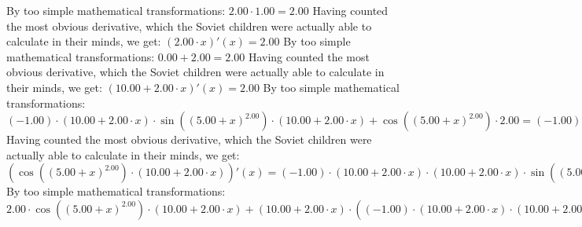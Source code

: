 \documentclass{article}
\begin{document}
\newline
By too simple mathematical transformations:
 ${{2.00} \cdot {1.00}} = {2.00}$ 
 \newline
 \newline 
Having counted the most obvious derivative, which the Soviet children were actually able to calculate in their minds, we get:
$({{2.00} \cdot {x}})'(x) = {2.00}$\newline
\newline
By too simple mathematical transformations:
 ${{0.00} + {2.00}} = {2.00}$ 
 \newline
 \newline 
Having counted the most obvious derivative, which the Soviet children were actually able to calculate in their minds, we get:
$({{10.00} + {{2.00} \cdot {x}}})'(x) = {2.00}$\newline
\newline
By too simple mathematical transformations:
 ${{{\left({-1.00}\right) \cdot {\left({{10.00} + {{2.00} \cdot {x}}}\right) \cdot  \sin {\left({\left({{5.00} + {x}}\right) ^ {2.00}}\right)} }} \cdot \left({{10.00} + {{2.00} \cdot {x}}}\right)} + { \cos {\left({\left({{5.00} + {x}}\right) ^ {2.00}}\right)}  \cdot {2.00}}} = {{\left({-1.00}\right) \cdot {\left({{10.00} + {{2.00} \cdot {x}}}\right) \cdot {\left({{10.00} + {{2.00} \cdot {x}}}\right) \cdot  \sin {\left({\left({{5.00} + {x}}\right) ^ {2.00}}\right)} }}} + {{2.00} \cdot  \cos {\left({\left({{5.00} + {x}}\right) ^ {2.00}}\right)} }}$ 
 \newline
 \newline 
Having counted the most obvious derivative, which the Soviet children were actually able to calculate in their minds, we get:
$({ \cos {\left({\left({{5.00} + {x}}\right) ^ {2.00}}\right)}  \cdot \left({{10.00} + {{2.00} \cdot {x}}}\right)})'(x) = {{\left({-1.00}\right) \cdot {\left({{10.00} + {{2.00} \cdot {x}}}\right) \cdot {\left({{10.00} + {{2.00} \cdot {x}}}\right) \cdot  \sin {\left({\left({{5.00} + {x}}\right) ^ {2.00}}\right)} }}} + {{2.00} \cdot  \cos {\left({\left({{5.00} + {x}}\right) ^ {2.00}}\right)} }}$\newline
\newline
By too simple mathematical transformations:
 ${{{2.00} \cdot { \cos {\left({\left({{5.00} + {x}}\right) ^ {2.00}}\right)}  \cdot \left({{10.00} + {{2.00} \cdot {x}}}\right)}} + {\left({{10.00} + {{2.00} \cdot {x}}}\right) \cdot \left({{\left({-1.00}\right) \cdot {\left({{10.00} + {{2.00} \cdot {x}}}\right) \cdot {\left({{10.00} + {{2.00} \cdot {x}}}\right) \cdot  \sin {\left({\left({{5.00} + {x}}\right) ^ {2.00}}\right)} }}} + {{2.00} \cdot  \cos {\left({\left({{5.00} + {x}}\right) ^ {2.00}}\right)} }}\right)}} = {{{2.00} \cdot { \cos {\left({\left({{5.00} + {x}}\right) ^ {2.00}}\right)}  \cdot \left({{10.00} + {{2.00} \cdot {x}}}\right)}} + {\left({{10.00} + {{2.00} \cdot {x}}}\right) \cdot \left({{\left({-1.00}\right) \cdot {\left({{10.00} + {{2.00} \cdot {x}}}\right) \cdot {\left({{10.00} + {{2.00} \cdot {x}}}\right) \cdot  \sin {\left({\left({{5.00} + {x}}\right) ^ {2.00}}\right)} }}} + {{2.00} \cdot  \cos {\left({\left({{5.00} + {x}}\right) ^ {2.00}}\right)} }}\right)}}$ 
\end{document}
